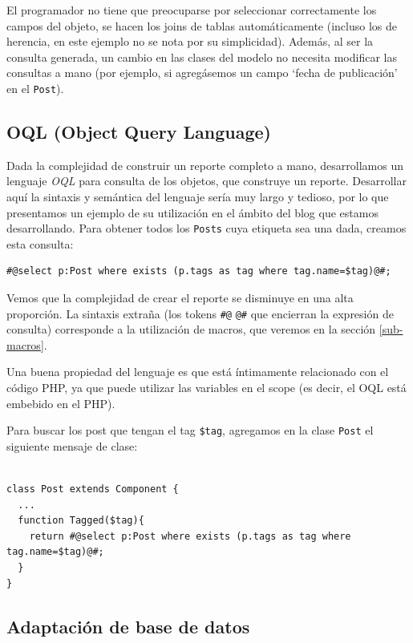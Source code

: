 El programador no tiene que preocuparse por seleccionar correctamente los campos del objeto, se hacen los joins de tablas automáticamente (incluso los de herencia, en este ejemplo no se nota por su simplicidad). Además, al ser la consulta generada, un cambio en las clases del modelo no necesita modificar las consultas a mano (por ejemplo, si agregásemos un campo `fecha de publicación' en el \verb"Post").

\subsection{OQL (Object Query Language)}
\label{sub-oql}
Dada la complejidad de construir un reporte completo a mano, desarrollamos un lenguaje \emph{OQL} para consulta de los objetos, que construye un reporte. Desarrollar aquí la sintaxis y semántica del lenguaje sería muy largo y tedioso, por lo que presentamos un ejemplo de su utilización en el ámbito del blog que estamos desarrollando. Para obtener todos los \verb"Posts" cuya etiqueta sea una dada, creamos esta consulta:

\begin{verbatim}
#@select p:Post where exists (p.tags as tag where tag.name=$tag)@#;
\end{verbatim}

Vemos que la complejidad de crear el reporte se disminuye en una alta proporción.
La sintaxis extraña (los tokens \verb"#@" \verb"@#" que encierran la expresión de consulta) corresponde a la utilización de macros, que veremos en la sección \ref{sub-macros}.

Una buena propiedad del lenguaje es que está íntimamente relacionado con el código PHP, ya que puede utilizar las variables en el scope (es decir, el OQL está embebido en el PHP).

Para buscar los post que tengan el tag  \verb"$tag", %
agregamos en la clase \verb"Post" el siguiente mensaje de clase:

\begin{verbatim}

class Post extends Component {
  ...
  function Tagged($tag){
    return #@select p:Post where exists (p.tags as tag where tag.name=$tag)@#;
  }
}

\end{verbatim}

\subsection{Adaptación de base de datos}
\label{sub-adapt}

